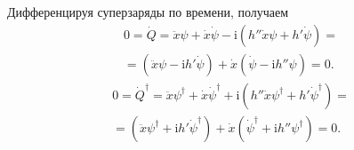 \documentclass[a4paper, 14pt]{extarticle}
\begin{document}
\begin{sol}
Дифференцируя суперзаряды по времени, получаем
\begin{multline*}
	0=\dot{Q}=\ddot{x}\psi+ \dot{x}\dot{\psi} - \mathrm{i} \left( h''\dot{x}\psi + h' \dot{\psi} \right) =\\=
	\left( \ddot{x} \psi-\mathrm{i} h'\dot{\psi} \right)+
	\dot{x}\left(\dot{\psi}-\mathrm{i} h''\psi \right)=0 
.\end{multline*} 
\begin{multline*}
	0=\dot{Q}^\dagger=\ddot{x}\psi^\dagger+ \dot{x}\dot{\psi}^\dagger + \mathrm{i} \left( h''\dot{x}\psi^\dagger + h' \dot{\psi} ^\dagger\right) =\\=
	\left( \ddot{x} \psi^\dagger+\mathrm{i} h'\dot{\psi} ^\dagger\right)+
	\dot{x}\left(\dot{\psi}^\dagger+\mathrm{i} h''\psi ^\dagger\right)=0 .\end{multline*} 

\end{sol}
\end{document}
